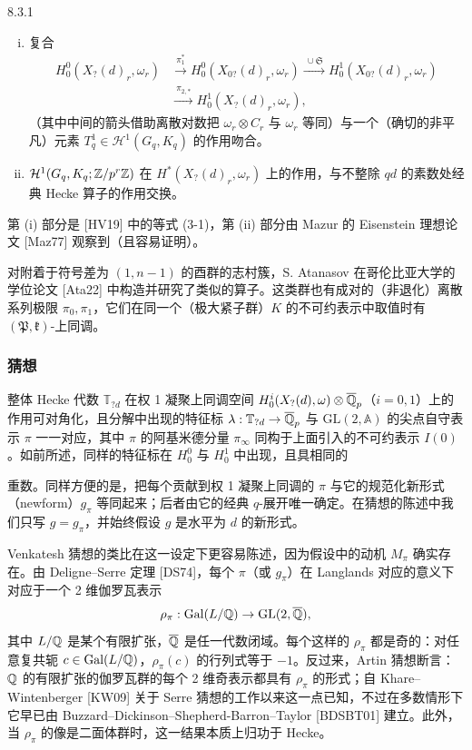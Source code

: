 \begin{prop}{8.3.1}\label{thm:a6-05-15}
\begin{enumerate}[(i)]
\item 复合
\[
\begin{aligned}
H^0_0(X_?(d)_r,\omega_r)&\xrightarrow{\ \pi_1^*\ }H^0_0(X_{0?}(d)_r,\omega_r)\xrightarrow{\ \cup\mathfrak S\ }H^1_0(X_{0?}(d)_r,\omega_r)\\
&\xrightarrow{\ \pi_{2,*}\ }H^1_0(X_?(d)_r,\omega_r),
\end{aligned}
\]
（其中中间的箭头借助离散对数把 $\omega_r\otimes C_r$ 与 $\omega_r$ 等同）与一个（确切的非平凡）元素 $T^1_q\in\mathcal H^1(G_q,K_q)$ 的作用吻合。
\item $\mathcal H^1(G_q,K_q;\mathbb{Z}/p^r\mathbb{Z})$ 在 $H^*(X_?(d)_r,\omega_r)$ 上的作用，与不整除 $qd$ 的素数处经典 Hecke 算子的作用交换。
\end{enumerate}
\end{prop}

第 (i) 部分是 [HV19] 中的等式 (3-1)，第 (ii) 部分由 Mazur 的 Eisenstein 理想论文 [Maz77] 观察到（且容易证明）。

对附着于符号差为 $(1,n-1)$ 的酉群的志村簇，S. Atanasov 在哥伦比亚大学的学位论文 [Ata22] 中构造并研究了类似的算子。这类群也有成对的（非退化）离散系列极限 $\pi_0,\pi_1$，它们在同一个（极大紧子群）$K$ 的不可约表示中取值时有 $(\mathfrak P,\mathfrak k)$-上同调。

\subsubsection{猜想}

整体 Hecke 代数 $\mathbb T_{?d}$ 在权 1 凝聚上同调空间 $H^i_0(X_?(d),\omega)\otimes\overline{\mathbb{Q}}_p$（$i=0,1$）上的作用可对角化，且分解中出现的特征标 $\lambda:\mathbb T_{?d}\to\overline{\mathbb{Q}}_p$ 与 $\mathrm{GL}(2,\mathbb A)$ 的尖点自守表示 $\pi$ 一一对应，其中 $\pi$ 的阿基米德分量 $\pi_\infty$ 同构于上面引入的不可约表示 $I(0)$。如前所述，同样的特征标在 $H^0_0$ 与 $H^1_0$ 中出现，且具相同的

重数。同样方便的是，把每个贡献到权 1 凝聚上同调的 $\pi$ 与它的规范化新形式（newform）$g_\pi$ 等同起来；后者由它的经典 $q$-展开唯一确定。在猜想的陈述中我们只写 $g=g_\pi$，并始终假设 $g$ 是水平为 $d$ 的新形式。

Venkatesh 猜想的类比在这一设定下更容易陈述，因为假设中的动机 $M_\pi$ 确实存在。由 Deligne--Serre 定理 [DS74]，每个 $\pi$（或 $g_\pi$）在 Langlands 对应的意义下对应于一个 2 维伽罗瓦表示
\[
\rho_\pi:\operatorname{Gal}(L/\mathbb{Q})\to\mathrm{GL}(2,\overline{\mathbb{Q}}),
\]
其中 $L/\mathbb{Q}$ 是某个有限扩张，$\overline{\mathbb{Q}}$ 是任一代数闭域。每个这样的 $\rho_\pi$ 都是奇的：对任意复共轭 $c\in\operatorname{Gal}(L/\mathbb{Q})$，$\rho_\pi(c)$ 的行列式等于 $-1$。反过来，Artin 猜想断言：$\mathbb{Q}$ 的有限扩张的伽罗瓦群的每个 2 维奇表示都具有 $\rho_\pi$ 的形式；自 Khare--Wintenberger [KW09] 关于 Serre 猜想的工作以来这一点已知，不过在多数情形下它早已由 Buzzard--Dickinson--Shepherd-Barron--Taylor [BDSBT01] 建立。此外，当 $\rho_\pi$ 的像是二面体群时，这一结果本质上归功于 Hecke。

